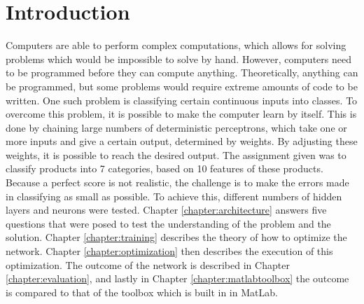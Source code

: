 \section{Introduction} 
\label {chapter:introduction}
Computers are able to perform complex computations, which allows for solving problems which would be impossible to solve by hand. However, computers need to be programmed before they can compute anything. Theoretically, anything can be programmed, but some problems would require extreme amounts of code to be written. One such problem is classifying certain continuous inputs into classes. To overcome this problem, it is possible to make the computer learn by itself. This is done by chaining large numbers of deterministic perceptrons, which take one or more inputs and give a certain output, determined by weights. By adjusting these weights, it is possible to reach the desired output. 
The assignment given was to classify products into 7 categories, based on 10 features of these products. Because a perfect score is not realistic, the challenge is to make the errors made in classifying as small as possible. To achieve this, different numbers of hidden layers and neurons were tested.
Chapter \ref{chapter:architecture} answers five questions that were posed to test the understanding of the problem and the solution. Chapter \ref{chapter:training} describes the theory of how to optimize the network. Chapter \ref{chapter:optimization} then describes the execution of this optimization. The outcome of the network is described in Chapter \ref{chapter:evaluation}, and lastly in Chapter \ref{chapter:matlabtoolbox} the outcome is compared to that of the toolbox which is built in in MatLab.